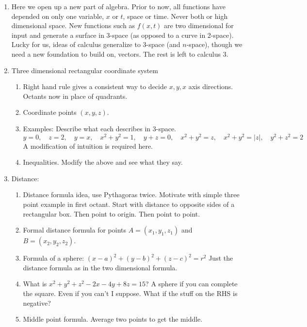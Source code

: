 \documentclass{article}
\begin{document}
\begin{enumerate}
\item Here we open up a new part of algebra. Prior to now, all functions have depended on only one variable, $x$ or $t$, space or time. Never both or high dimensional space. New functions such as $f(x,t)$ are two dimensional for input and generate a surface in 3-space (as opposed to a curve in 2-space). Lucky for us, ideas of calculus generalize to 3-space (and $n$-space), though we need a new foundation to build on, vectors. The rest is left to calculus 3.

\item Three dimensional rectangular coordinate system
\begin{enumerate}

\item Right hand rule gives a consistent way to decide $x,y,x$ axis directions. Octants now in place of quadrants.
\item Coordinate points $(x,y,z)$. 
\item Examples: Describe what each describes in 3-space.
$$
y = 0, \quad z = 2, \quad y = x, \quad x^2+y^2 = 1, \quad y +z = 0, \quad x^2+y^2 = z, \quad x^2+y^2 = |z|, \quad y^2+z^2=2
$$
A modification of intuition is required here.
\item Inequalities. Modify the above and see what they say.
\end{enumerate}

\item Distance:
\begin{enumerate}
\item Distance formula idea, use Pythagoras twice. Motivate with simple three point example in first octant. Start with distance to opposite sides of a rectangular box. Then point to origin. Then point to point.
\item Formal distance formula for points $A=(x_1,y_1,z_1)$ and $B=(x_2,y_2,z_2)$.
\item Formula of a sphere: $(x-a)^2+(y-b)^2+(z-c)^2 = r^2$  Just the distance formula as in the two dimensional formula.
\item What is $x^2+y^2+z^2-2x-4y+8z = 15$? A sphere if you can complete the square. Even if you can't I suppose. What if the stuff on the RHS is negative?
\item Middle point formula. Average two points to get the middle.
\end{enumerate}


\end{enumerate}
\end{document}
